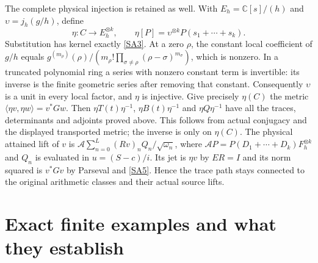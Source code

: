 \documentclass[11pt]{article}
\newcommand{\C}{\mathbb C}\newcommand{\R}{\mathbb R}
\begin{document}
The complete physical injection is retained as well.
With $E_h=\C[s]/(h)$ and $\upsilon=j_h(g/h)$, define
\begin{equation}\tag{SA37}\label{SA37}
\eta:C\longrightarrow E_h^{\otimes k},\qquad
\eta[P]=\upsilon^{\otimes k}P(s_1+\cdots+s_k).
\end{equation}
Substitution has kernel exactly \eqref{SA3}.
At a zero $\rho$, the constant local coefficient of
$g/h$ equals
$g^{(m_\rho)}(\rho)/
(m_\rho!\prod_{\sigma\ne\rho}(\rho-\sigma)^{m_\sigma})$,
which is nonzero. In a truncated polynomial ring a
series with nonzero constant term is invertible: its
inverse is the finite geometric series after removing
that constant. Consequently $\upsilon$ is a unit in
every local factor, and $\eta$ is injective.
Give precisely $\eta(C)$ the metric
$\langle\eta v,\eta w\rangle=v^*Gw$.
Then $\eta T(t)\eta^{-1}$, $\eta B(t)\eta^{-1}$ and
$\eta Q\eta^{-1}$ have all the traces, determinants
and adjoints proved above. This follows from actual
conjugacy and the displayed transported metric; the
inverse is only on $\eta(C)$.
The physical attained lift of $v$ is
$\mathcal A\sum_{n=0}^L(Rv)_nQ_n/\sqrt{\omega_n}$,
where $\mathcal A P=P(D_1+\cdots+D_k)F_h^{\otimes k}$
and $Q_n$ is evaluated in $u=(S-c)/i$.
Its jet is $\eta v$ by $ER=I$ and its norm squared is
$v^*Gv$ by Parseval and \eqref{SA5}.
Hence the trace path stays connected to the original
arithmetic classes and their actual source lifts.

\section{Exact finite examples and what they establish}
\end{document}
